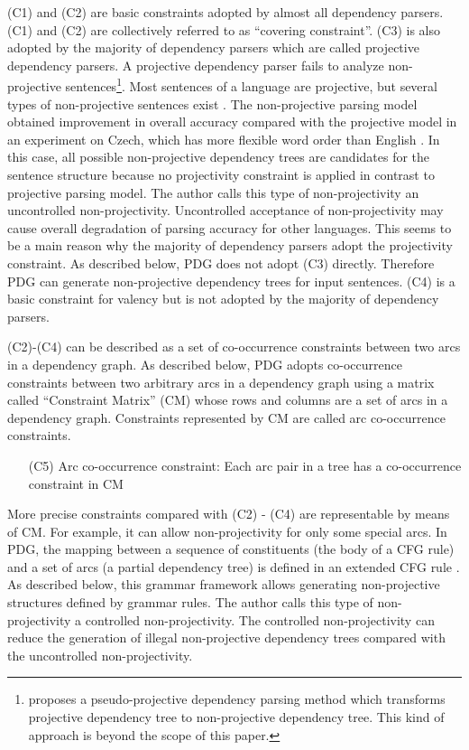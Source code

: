 {\mynoindent}(C1) and (C2) are basic constraints adopted by almost all
dependency parsers. (C1) and (C2) are collectively referred to as
``covering constraint''. (C3) is also adopted by the majority of
dependency parsers which are called projective dependency parsers. A
projective dependency parser fails to analyze non-projective
sentences\footnote{\cite{Nivre05} proposes a pseudo-projective
dependency parsing method which transforms projective dependency tree
to non-projective dependency tree. This kind of approach is beyond the
scope of this paper.}.
Most sentences of a language are projective, but several types of
non-projective sentences exist \cite{Meluk88}. The non-projective
parsing model obtained improvement in overall accuracy compared with
the projective model in an experiment on Czech, which has more
flexible word order than English \cite{McDonald05}. 
In this case, all possible non-projective dependency trees are
candidates for the sentence structure because no projectivity
constraint is applied in contrast to projective parsing model. The
author calls this type of non-projectivity an uncontrolled
non-projectivity. Uncontrolled acceptance of non-projectivity may
cause overall degradation of parsing accuracy for other
languages. This seems to be a main reason why the majority of
dependency parsers adopt the projectivity constraint. As described below, PDG does not adopt (C3) directly. Therefore PDG
can generate non-projective dependency trees for input sentences.
(C4) is a basic constraint for valency but is not adopted by the majority
of dependency parsers. 

(C2)-(C4) can be described as a set of co-occurrence constraints
between two arcs in a dependency graph. As described below, PDG adopts
co-occurrence constraints between two arbitrary arcs in a dependency
graph using a matrix called ``Constraint Matrix'' (CM) whose rows
and columns are a set of arcs in a dependency graph. Constraints
represented by CM are called arc co-occurrence constraints.

{\mygapskip}
\begin{itemize}
\item [(C5)] Arc co-occurrence constraint: Each arc pair in a tree has a co-occurrence constraint in CM
\end{itemize}
{\mygapskip}

{\mynoindent}More precise constraints compared with (C2) - (C4) are
representable by means of CM. For example, it can allow
non-projectivity for only some special arcs. In PDG, the mapping
between a sequence of constituents (the body of a CFG rule) and a set
of arcs (a partial dependency tree) is defined in an extended CFG rule
\cite{Hirakawa05a}. As described below, this grammar framework allows
generating non-projective structures defined by grammar rules. The
author calls this type of non-projectivity a controlled
non-projectivity. The controlled non-projectivity can reduce the
generation of illegal non-projective dependency trees compared
with the uncontrolled non-projectivity.

